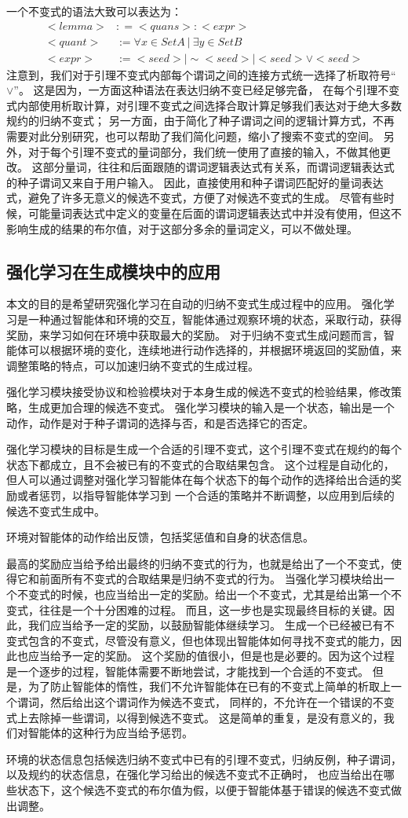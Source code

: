 一个不变式的语法大致可以表达为：
\begin{align}
    <lemma> &: = <quans>:<expr>   \\
    <quant> &:= \forall x  \in SetA  \ |\  \exists y  \in SetB \\
    <expr>  &:= <seed>| \sim<seed> | <seed> \lor <seed> 
\end{align}
注意到，我们对于引理不变式内部每个谓词之间的连接方式统一选择了析取符号“$\lor$”。
这是因为，一方面这种语法在表达归纳不变已经足够完备，
在每个引理不变式内部使用析取计算，对引理不变式之间选择合取计算足够我们表达对于绝大多数规约的归纳不变式；
另一方面，由于简化了种子谓词之间的逻辑计算方式，不再需要对此分别研究，也可以帮助了我们简化问题，缩小了搜索不变式的空间。
另外，对于每个引理不变式的量词部分，我们统一使用了直接的输入，不做其他更改。
这部分量词，往往和后面跟随的谓词逻辑表达式有关系，而谓词逻辑表达式的种子谓词又来自于用户输入。
因此，直接使用和种子谓词匹配好的量词表达式，避免了许多无意义的候选不变式，方便了对候选不变式的生成。
尽管有些时候，可能量词表达式中定义的变量在后面的谓词逻辑表达式中并没有使用，但这不影响生成的结果的布尔值，对于这部分多余的量词定义，可以不做处理。


\subsection{强化学习在生成模块中的应用}

本文的目的是希望研究强化学习在自动的归纳不变式生成过程中的应用。
强化学习是一种通过智能体和环境的交互，智能体通过观察环境的状态，采取行动，获得奖励，来学习如何在环境中获取最大的奖励。
对于归纳不变式生成问题而言，智能体可以根据环境的变化，连续地进行动作选择的，并根据环境返回的奖励值，来调整策略的特点，可以加速归纳不变式的生成过程。

强化学习模块接受\TLA 协议和检验模块对于本身生成的候选不变式的检验结果，修改策略，生成更加合理的候选不变式。
强化学习模块的输入是一个状态，输出是一个动作，动作是对于种子谓词的选择与否，和是否选择它的否定。

强化学习模块的目标是生成一个合适的引理不变式，这个引理不变式在规约的每个状态下都成立，且不会被已有的不变式的合取结果包含。
这个过程是自动化的，但人可以通过调整对强化学习智能体在每个状态下的每个动作的选择给出合适的奖励或者惩罚，以指导智能体学习到
一个合适的策略并不断调整，以应用到后续的候选不变式生成中。

环境对智能体的动作给出反馈，包括奖惩值和自身的状态信息。

最高的奖励应当给予给出最终的归纳不变式的行为，也就是给出了一个不变式，使得它和前面所有不变式的合取结果是归纳不变式的行为。
当强化学习模块给出一个不变式的时候，也应当给出一定的奖励。给出一个不变式，尤其是给出第一个不变式，往往是一个十分困难的过程。
而且，这一步也是实现最终目标的关键。因此，我们应当给予一定的奖励，以鼓励智能体继续学习。
生成一个已经被已有不变式包含的不变式，尽管没有意义，但也体现出智能体如何寻找不变式的能力，因此也应当给予一定的奖励。
这个奖励的值很小，但是也是必要的。因为这个过程是一个逐步的过程，智能体需要不断地尝试，才能找到一个合适的不变式。
但是，为了防止智能体的惰性，我们不允许智能体在已有的不变式上简单的析取上一个谓词，然后给出这个谓词作为候选不变式，
同样的，不允许在一个错误的不变式上去除掉一些谓词，以得到候选不变式。
这是简单的重复，是没有意义的，我们对智能体的这种行为应当给予惩罚。

环境的状态信息包括候选归纳不变式中已有的引理不变式，归纳反例，种子谓词，以及规约的状态信息，在强化学习给出的候选不变式不正确时，
也应当给出在哪些状态下，这个候选不变式的布尔值为假，以便于智能体基于错误的候选不变式做出调整。
